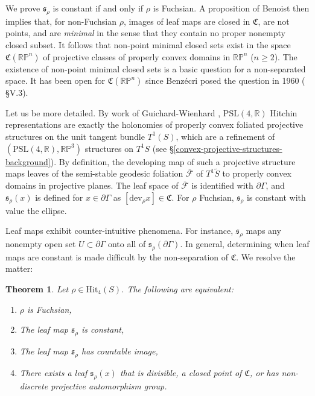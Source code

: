 \documentclass[12pt,a4paper]{amsart}
\newcommand{\bbR}{\mathbb R}
\newcommand{\RP}{\mathbb R \mathbb P}
\theoremstyle{definition}
\theoremstyle{plain}
\newtheorem{theorem}{Theorem}[section]
\numberwithin{equation}{section}
\begin{document}
We prove $\mathfrak{s}_\rho$ is constant if and only if $\rho$ is Fuchsian. A proposition of Benoist \cite{benoist2023chat} then implies that, for non-Fuchsian $\rho$, images of leaf maps are closed in $\mathfrak{C}$, are not points, and are \textit{minimal} in the sense that they contain no proper nonempty closed subset. It follows that non-point minimal closed sets exist in the space $\mathfrak{C}(\RP^n)$ of projective classes of properly convex domains in $\RP^n$ ($n \geq 2$). The existence of non-point minimal closed sets is a basic question for a non-separated space. It has been open for $\mathfrak{C}(\RP^n)$ since Benz\'ecri posed the question in 1960 (\cite{benzecri1960thesis} \S V.3).

Let us be more detailed. By work of Guichard-Wienhard \cite{guichard2008convex}, $\text{PSL}(4,\bbR)$ Hitchin representations are exactly the holonomies of properly convex foliated projective structures on the unit tangent bundle $T^1(S)$, which are a refinement of $(\text{PSL}(4,\mathbb{R}), \mathbb{RP}^3)$ structures on $T^1S$ (see \S \ref{convex-projective-structures-background}). By definition, the developing map of such a projective structure maps leaves of the semi-stable geodesic foliation $\overline{\mathcal{F}}$ of $T^1\widetilde{S}$ to properly convex domains in projective planes. The leaf space of $\overline{\mathcal{F}}$ is identified with $\partial \Gamma$, and $\mathfrak{s}_\rho(x)$ is defined for $x \in \partial \Gamma$ as $[\text{dev}_\rho x] \in \mathfrak{C}$. For $\rho$ Fuchsian, $\mathfrak{s}_\rho$ is constant with value the ellipse.

Leaf maps exhibit counter-intuitive phenomena. For instance, $\mathfrak{s}_\rho$ maps any nonempty open set $U \subset \partial \Gamma$ onto all of $\mathfrak{s}_\rho(\partial \Gamma)$. In general, determining when leaf maps are constant is made difficult by the non-separation of $\mathfrak{C}$. We resolve the matter:

\begin{theorem}\label{theorem-fuchsian-locus-characterization}
    Let {\rm{$\rho \in \text{Hit}_4(S)$}}. The following are equivalent:
        \begin{enumerate}
            \item $\rho$ is Fuchsian,
            \item The leaf map $\mathfrak{s}_\rho$ is constant,
            \item The leaf map $\mathfrak{s}_\rho$ has countable image,
            \item There exists a leaf $\mathfrak{s}_\rho(x)$ that is divisible, a closed point of $\mathfrak{C}$, or has non-discrete projective automorphism group.
        \end{enumerate}
\end{theorem}
\end{document}
